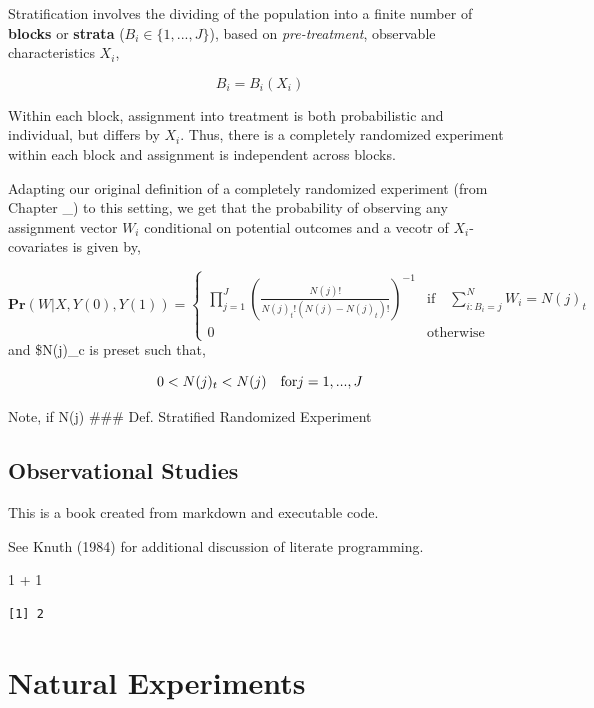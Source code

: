 \documentclass[
  letterpaper,
  DIV=11,
  numbers=noendperiod]{scrreprt}
\newenvironment{Shaded}{\begin{snugshade}}{\end{snugshade}}
\newcommand{\DecValTok}[1]{\textcolor[rgb]{0.68,0.00,0.00}{#1}}
\newcommand{\SpecialCharTok}[1]{\textcolor[rgb]{0.37,0.37,0.37}{#1}}
\theoremstyle{definition}
\theoremstyle{remark}
\begin{document}
Stratification involves the dividing of the population into a finite
number of \textbf{blocks} or \textbf{strata} (\(B_i \in \{1,...,J\}\)),
based on \emph{pre-treatment}, observable characteristics \(X_i\),

\[
B_i = B_i(X_i)
\]

Within each block, assignment into treatment is both probabilistic and
individual, but differs by \(X_i\). Thus, there is a completely
randomized experiment within each block and assignment is independent
across blocks.

Adapting our original definition of a completely randomized experiment
(from Chapter \_) to this setting, we get that the probability of
observing any assignment vector \(W_i\) conditional on potential
outcomes and a vecotr of \(X_i\)-covariates is given by,

\[
\mathbf{Pr}(W|X,Y(0),Y(1))=
\begin{cases}
\prod^J_{j=1} (\frac{N(j)!}{N(j)_t!(N(j)-N(j)_t)!})^{-1} & \text{if} \quad \sum^N_{i:B_i=j} W_i=N(j)_t \\
                    0 &\text{otherwise}
\end{cases}
\] and \$N(j)\_c is preset such that,

\[
0 < N(j)_t <N(j) \quad \text{for} \space j = 1,...,J
\]

Note, if N(j) \#\#\# Def. Stratified Randomized Experiment


\hypertarget{observational-studies}{%
\chapter{Observational Studies}\label{observational-studies}}

This is a book created from markdown and executable code.

See Knuth (1984) for additional discussion of literate programming.

\begin{Shaded}
\begin{Highlighting}[]
\DecValTok{1} \SpecialCharTok{+} \DecValTok{1}
\end{Highlighting}
\end{Shaded}

\begin{verbatim}
[1] 2
\end{verbatim}

\part{Natural Experiments}
\end{document}
